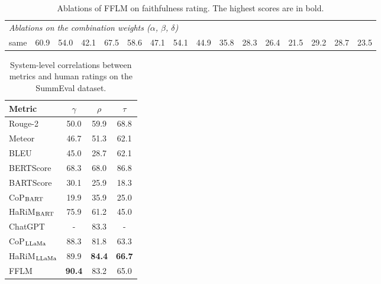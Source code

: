 \begin{table}[th]
\begin{tabular}{l|ccc|ccc|ccc|ccc|ccc}
		
		\hline
		\multicolumn{16}{l}{\textit{Ablations on the combination weights ($\alpha$, $\beta$, $\delta$)}} \\
		same & 60.9 & 54.0 & 42.1 & 67.5 & 58.6 & 47.1 & 54.1 & 44.9 & 35.8 & 28.3 & 26.4 & 21.5 & 29.2 & 28.7 & 23.5 \\
		
		\bottomrule[1pt]
	\end{tabular}
	\caption{Ablations of FFLM on faithfulness rating. The highest scores are in bold.} %
	\label{tab:ablations-fr}
\end{table}


\begin{table}[t]
	\scriptsize
	\centering
	\begin{tabular}{l|ccc} %
		\toprule[1pt]
		Metric & $\gamma$ &$\rho$ & $\tau$  \\
		\hline
		Rouge-2& 50.0 & 59.9 & 68.8\\
		Meteor& 46.7 & 51.3 & 62.1\\
		BLEU& 45.0 & 28.7 & 62.1 \\
		BERTScore& 68.3 & 68.0 & 86.8 \\
		BARTScore & 30.1 & 25.9 & 18.3 \\
		CoP$_{\rm BART}$& 19.9 & 35.9 & 25.0 \\
		HaRiM$_{\rm BART}$  & 75.9 & 61.2 & 45.0 \\
		ChatGPT & - & 83.3 & -\\
		\hline
		CoP$_{\rm LLaMa}$ & 88.3 & 81.8 & 63.3 \\
		HaRiM$_{\rm LLaMa}$ & 89.9 & \textbf{84.4} & \textbf{66.7}\\
		FFLM & \textbf{90.4} & 83.2 & 65.0 \\
		\bottomrule[1pt]
	\end{tabular}
	\caption{System-level correlations between metrics and human ratings on the SummEval dataset.}
	\label{tab:system-correlation}
\end{table}


